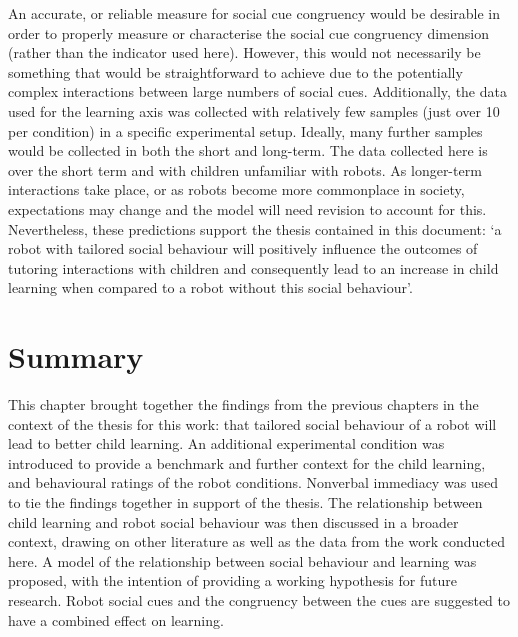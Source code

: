 An accurate, or reliable measure for social cue congruency would be desirable in order to properly measure or characterise the social cue congruency dimension (rather than the indicator used here). However, this would not necessarily be something that would be straightforward to achieve due to the potentially complex interactions between large numbers of social cues. Additionally, the data used for the learning axis was collected with relatively few samples (just over 10 per condition) in a specific experimental setup. Ideally, many further samples would be collected in both the short and long-term. The data collected here is over the short term and with children unfamiliar with robots. As longer-term interactions take place, or as robots become more commonplace in society, expectations may change and the model will need revision to account for this. Nevertheless, these predictions support the thesis contained in this document: `a robot with \gls{tailored} social behaviour will positively influence the outcomes of tutoring interactions with children and consequently lead to an increase in child \gls{learning} when compared to a robot without this social behaviour'.

\section{Summary} \label{sec:behave-summary}
This chapter brought together the findings from the previous chapters in the context of the thesis for this work: that tailored social behaviour of a robot will lead to better child \gls{learning}. An additional experimental condition was introduced to provide a benchmark and further context for the child \gls{learning}, and behavioural ratings of the robot conditions. Nonverbal immediacy was used to tie the findings together in support of the thesis. The relationship between child \gls{learning} and robot social behaviour was then discussed in a broader context, drawing on other literature as well as the data from the work conducted here. A model of the relationship between social behaviour and \gls{learning} was proposed, with the intention of providing a working hypothesis for future research. Robot social cues and the congruency between the cues are suggested to have a combined effect on \gls{learning}.